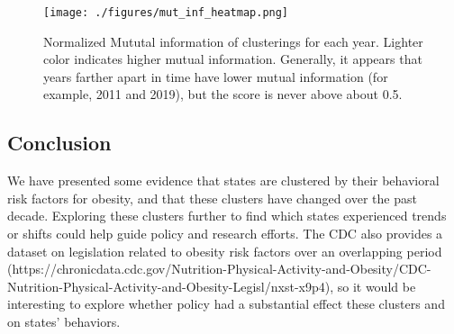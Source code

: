\documentclass[11pt]{article}
\begin{document}
\begin{figure}[htbp]
\centering
\texttt{[image: ./figures/mut\_inf\_heatmap.png]}
\caption{Normalized Mututal information of clusterings for each year. Lighter color indicates higher mutual information. Generally, it appears that years farther apart in time have lower mutual information (for example, 2011 and 2019), but the score is never above about 0.5.}
\label{fig:mut_inf} 
\end{figure}

\subsection{Conclusion}
We have presented some evidence that states are clustered by their behavioral risk factors for obesity, and that these clusters have changed over the past decade. Exploring these clusters further to find which states experienced trends or shifts could help guide policy and research efforts. The CDC also provides a dataset on legislation related to obesity risk factors over an overlapping period (https://chronicdata.cdc.gov/Nutrition-Physical-Activity-and-Obesity/CDC-Nutrition-Physical-Activity-and-Obesity-Legisl/nxst-x9p4), so it would be interesting to explore whether policy had a substantial effect these clusters and on states' behaviors. 
 
\end{document}
